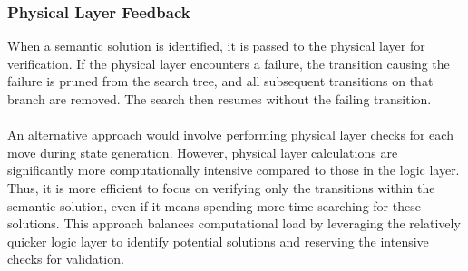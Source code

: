 \subsubsection{Physical Layer Feedback}
When a semantic solution is identified, it is passed to the physical layer for verification. If the physical layer encounters a failure, the transition causing the failure is pruned from the search tree, and all subsequent transitions on that branch are removed. The search then resumes without the failing transition.
\\\\
An alternative approach would involve performing physical layer checks for each move during state generation. However, physical layer calculations are significantly more computationally intensive compared to those in the logic layer. Thus, it is more efficient to focus on verifying only the transitions within the semantic solution, even if it means spending more time searching for these solutions. This approach balances computational load by leveraging the relatively quicker logic layer to identify potential solutions and reserving the intensive checks for validation.
